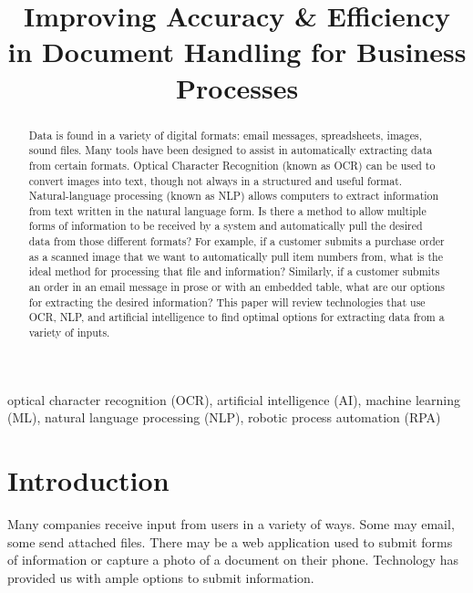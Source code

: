 \documentclass[conference]{IEEEtran}
\begin{document}
\title{Improving Accuracy \& Efficiency in Document Handling for Business Processes}

\author{
}

\maketitle

\begin{abstract}
Data is found in a variety of digital formats: email messages, spreadsheets, images, sound files. Many tools have been designed to assist in automatically extracting data from certain formats. Optical Character Recognition (known as OCR) can be used to convert images into text, though not always in a structured and useful format. Natural-language processing (known as NLP) allows computers to extract information from text written in the natural language form. Is there a method to allow multiple forms of information to be received by a system and automatically pull the desired data from those different formats? For example, if a customer submits a purchase order as a scanned image that we want to automatically pull item numbers from, what is the ideal method for processing that file and information? Similarly, if a customer submits an order in an email message in prose or with an embedded table, what are our options for extracting the desired information? This paper will review technologies that use OCR, NLP, and artificial intelligence to find optimal options for extracting data from a variety of inputs.
\end{abstract}

\begin{IEEEkeywords}
optical character recognition (OCR), artificial intelligence (AI), machine learning (ML), natural language processing (NLP), robotic process automation (RPA)
\end{IEEEkeywords}

\section{Introduction}
Many companies receive input from users in a variety of ways. Some may email, some send attached files. There may be a web application used to submit forms of information or capture a photo of a document on their phone. Technology has provided us with ample options to submit information.
\end{document}
